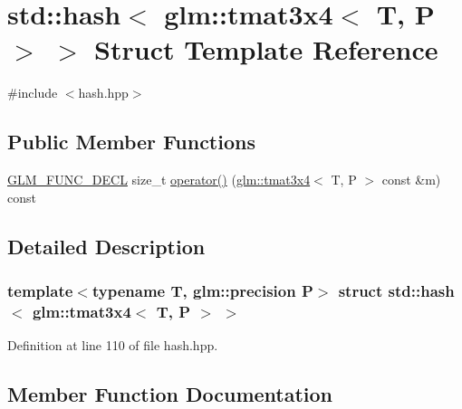 \hypertarget{structstd_1_1hash_3_01glm_1_1tmat3x4_3_01_t_00_01_p_01_4_01_4}{}\section{std\+::hash$<$ glm\+::tmat3x4$<$ T, P $>$ $>$ Struct Template Reference}
\label{structstd_1_1hash_3_01glm_1_1tmat3x4_3_01_t_00_01_p_01_4_01_4}


{\ttfamily \#include $<$hash.\+hpp$>$}

\subsection*{Public Member Functions}
\begin{DoxyCompactItemize}
\item 
\mbox{\hyperlink{setup_8hpp_ab2d052de21a70539923e9bcbf6e83a51}{G\+L\+M\+\_\+\+F\+U\+N\+C\+\_\+\+D\+E\+CL}} size\+\_\+t \mbox{\hyperlink{structstd_1_1hash_3_01glm_1_1tmat3x4_3_01_t_00_01_p_01_4_01_4_a483ef82653ebc8f75157832144d6d886}{operator()}} (\mbox{\hyperlink{structglm_1_1tmat3x4}{glm\+::tmat3x4}}$<$ T, P $>$ const \&m) const
\end{DoxyCompactItemize}


\subsection{Detailed Description}
\subsubsection*{template$<$typename T, glm\+::precision P$>$\newline
struct std\+::hash$<$ glm\+::tmat3x4$<$ T, P $>$ $>$}



Definition at line 110 of file hash.\+hpp.



\subsection{Member Function Documentation}
\mbox{\label{structstd_1_1hash_3_01glm_1_1tmat3x4_3_01_t_00_01_p_01_4_01_4_a483ef82653ebc8f75157832144d6d886}} 
